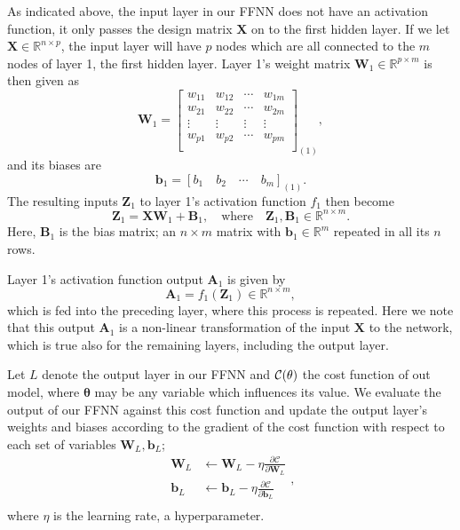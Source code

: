 \documentclass[]{article}
\begin{document}
As indicated above, the input layer in our FFNN does not have an activation function, it only passes the design matrix $\mathbf{X}$ on to the first hidden layer. If we let $\mathbf{X} \in \mathbb{R}^{n \times p}$, the input layer will have $p$ nodes which are all connected to the $m$ nodes of layer 1, the first hidden layer. Layer 1's weight matrix $\mathbf{W}_1 \in \mathbb{R}^{p \times m}$ is then given as
\begin{equation}
	\mathbf{W}_1 = 
	\left[\begin{array}{cccc}
		w_{11} &w_{12} & \cdots &w_{1m} \\
		w_{21} &w_{22} & \cdots &w_{2m} \\
		\vdots &\vdots &\vdots  &\vdots \\ 
		w_{p1} &w_{p2} & \cdots &w_{pm} \\
	\end{array} \right]_{(1)},
\end{equation} 
and its biases are
\begin{equation}
	\mathbf{b}_1 = [b_1 \quad b_2 \quad \cdots \quad b_m]_{(1)}.
\end{equation}
The resulting inputs $\mathbf{Z}_1$ to layer 1's activation function $f_1$ then become
\begin{equation} \label{inputs}
	\mathbf{Z}_1 = \mathbf{X} \mathbf{W}_1 + \mathbf{B}_1, \quad \text{where} \quad \mathbf{Z}_1, \mathbf{B}_1 \in \mathbb{R}^{n \times m}.
\end{equation}
Here, $\mathbf{B}_1$ is the bias matrix; an $n \times m$ matrix with $\mathbf{b}_1 \in \mathbb{R}^m$ repeated in all its $n$ rows.

Layer 1's activation function output $\mathbf{A}_1$ is given by
\begin{equation} \label{outputs}
	\mathbf{A}_1 = f_1(\mathbf{Z}_1) \in \mathbb{R}^{n \times m},
\end{equation}
which is fed into the preceding layer, where this process is repeated. Here we note that this output $\mathbf{A}_1$ is a non-linear transformation of the input $\mathbf{X}$ to the network, which is true also for the remaining layers, including the output layer.

\vspace{5mm}

Let $L$ denote the output layer in our FFNN and $\cal{C}(\mathbf{\theta})$ the cost function of out model, where $\mathbf{\theta}$ may be any variable which influences its value. We evaluate the output of our FFNN against this cost function and update the output layer's weights and biases according to the gradient of the cost function with respect to each set of variables $\mathbf{W}_L, \mathbf{b}_L$;
\begin{equation} \label{wb-update}
\begin{aligned}
		\mathbf{W}_L &\leftarrow \mathbf{W}_L - \eta \frac{\partial \mathcal{C}}{\partial \mathbf{W}_L} \\
		\mathbf{b}_L &\leftarrow \mathbf{b}_L - \eta \frac{\partial \mathcal{C}}{\partial \mathbf{b}_L} \\
\end{aligned},
\end{equation}
where $\eta$ is the learning rate, a hyperparameter.
\end{document}

